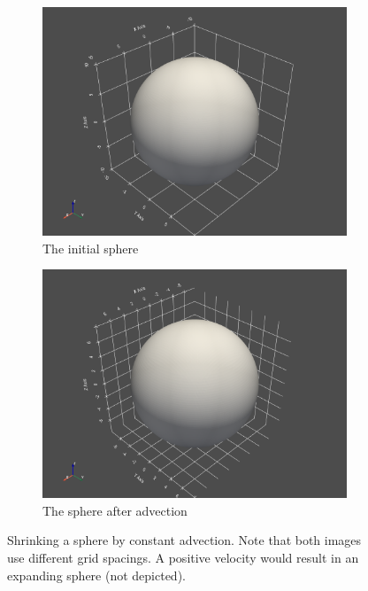 \begin{figure}[h]
    \begin{subfigure}{0.45\textwidth}
    \includegraphics[width=1\linewidth]{res/task1.1_sphere1.png} 
    \caption{The initial sphere}
    
\end{subfigure}
    \begin{subfigure}{0.45\textwidth}
    \includegraphics[width=1\linewidth]{res/task1.1_sphere2.png}
    \caption{The sphere after advection}
\end{subfigure}

\caption{Shrinking a sphere by constant advection. Note that both images use different grid spacings. A positive velocity would result in an expanding sphere (not depicted).}
\label{fig:task1.1_spheres}
\end{figure}


